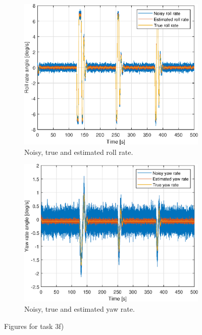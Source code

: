 \begin{figure}[ht]
    \begin{subfigure}[b]{0.45\textwidth}
		\includegraphics[width=\textwidth]{figures/3f/roll_rate_p.eps}
		\caption{Noisy, true and estimated roll rate. }
		\label{fig:3f_roll_rate_p}
	\end{subfigure}
	\begin{subfigure}[b]{0.45\textwidth}
		\includegraphics[width=\textwidth]{figures/3f/yaw_rate_r.eps}
		\caption{Noisy, true and estimated yaw rate. }
		\label{fig:3f_yaw_rate_r}
	\end{subfigure}		
	\caption{Figures for task 3f)}\label{fig:3f}
\end{figure}


